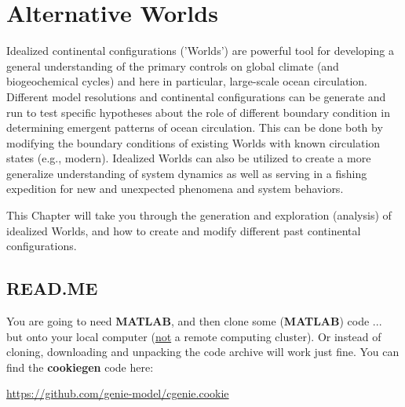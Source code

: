 
\cleardoublepage


\chapter{Alternative Worlds}\label{ch:alt-worlds}

\hfill \break

\noindent Idealized continental configurations ('Worlds') are powerful tool for developing a general understanding of the primary controls on global climate (and biogeochemical cycles) and here in particular, large-scale ocean circulation. Different model resolutions and continental configurations can be generate and run to test specific hypotheses about the role of different boundary condition in determining emergent patterns of ocean circulation. This can be done both by modifying the boundary conditions of existing Worlds with known circulation states (e.g., modern). Idealized Worlds can also be utilized to create a more generalize understanding of system dynamics as well as serving in a fishing expedition for new and unexpected phenomena and system behaviors.

\vspace{1mm}
This Chapter will take you through the generation and exploration (analysis) of idealized Worlds, and how to create and modify different past continental configurations.

\newpage

\section*{READ.ME}

You are going to need \textbf{MATLAB}, and then clone some (\textbf{MATLAB}) code ... but onto your local computer (\uline{not} a remote computing cluster). Or instead of cloning, downloading and unpacking the code archive will work just fine. You can find the \textbf{cookiegen} code here:

\vspace{1mm}
\noindent \textsf{\footnotesize \href{https://github.com/genie-model/cgenie.cookie.git}{\color{blue} https://github.com/genie-model/cgenie.cookie}}

